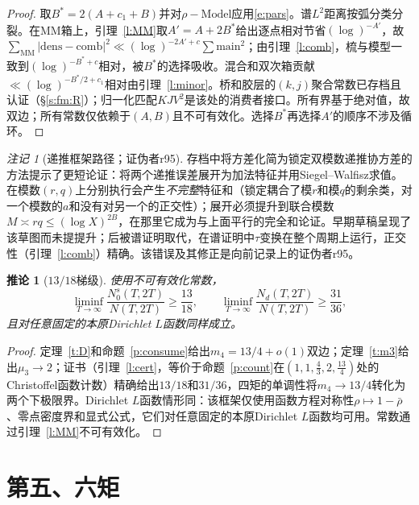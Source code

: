 \documentclass[11pt]{article}
\numberwithin{equation}{section}
\newtheorem{corollary}[theorem]{推论}
\theoremstyle{definition}
\theoremstyle{remark}
\newtheorem{remark}[theorem]{注记}
\begin{document}
\begin{proof}
取$B^{*}=2(A+c_1+B)$并对$\rho-\mathrm{Model}$应用\eqref{e:pars}。谱$L^2$距离按弧分类分裂。在MM箱上，引理~\ref{l:MM}取$A'=A+2B^{*}$给出逐点相对节省$(\log)^{-A'}$，故$\sum_{\mathrm{MM}}|\mathrm{dens}-\mathrm{comb}|^{2}
\ll(\log)^{-2A'+c}\sum\mathrm{main}^{2}$；由引理~\ref{l:comb}，梳与模型一致到$(\log)^{-B^{*}+c}$相对，被$B^{*}$的选择吸收。混合和双次箱贡献$\ll(\log)^{-B^{*}/2+c_1}$相对由引理~\ref{l:minor}。桥和胶层的$(k,j)$聚合常数已存档且认证（\S\ref{s:fm:R}）；归一化匹配$KJV^{2}$是该处的消费者接口。所有界基于绝对值，故双边；所有常数仅依赖于$(A,B)$且不可有效化。选择$B^{*}$再选择$A'$的顺序不涉及循环。
\end{proof}

\begin{remark}[递推框架路径；证伪者r95]\label{rem:prog}
存档中将方差化简为锁定双模数递推协方差的方法提示了更短论证：将两个递推误差展开为加法特征并用Siegel--Walfisz求值。在模数$(r,q)$上分别执行会产生\emph{不完整}特征和（锁定耦合了模$r$和模$q$的剩余类，对一个模数的$a$和没有对另一个的正交性）；展开必须提升到联合模数$M\asymp rq\le(\log X)^{2B}$，在那里它成为与上面平行的完全和论证。早期草稿呈现了该草图而未提提升；后被谱证明取代，在谱证明中$\tau$变换在整个周期上运行，正交性（引理~\ref{l:comb}）精确。该错误及其修正是向前记录上的证伪者r95。
\end{remark}

\begin{corollary}[$13/18$梯级]\label{c:1318}
使用不可有效化常数，
\[
\liminf_{T\to\infty}\frac{N_0^{s}(T,2T)}{N(T,2T)}\ge\frac{13}{18},
\qquad
\liminf_{T\to\infty}\frac{N_d(T,2T)}{N(T,2T)}\ge\frac{31}{36},
\]
且对任意固定的本原Dirichlet $L$函数同样成立。
\end{corollary}

\begin{proof}
定理~\ref{t:D}和命题~\ref{p:consume}给出$m_4=13/4+o(1)$双边；定理~\ref{t:m3}给出$\mu_3\to2$；证书（引理~\ref{l:cert}，等价于命题~\ref{p:count}在$(1,1,\tfrac43,2,\tfrac{13}4)$处的Christoffel函数计数）精确给出$13/18$和$31/36$，四矩的单调性将$m_4\to13/4$转化为两个下极限界。Dirichlet $L$函数情形同\cite[定理E]{C26}：该框架仅使用函数方程对称性$\rho\mapsto1-\bar\rho$、零点密度界和显式公式，它们对任意固定的本原Dirichlet $L$函数均可用。常数通过引理~\ref{l:MM}不可有效化。
\end{proof}

\section{第五、六矩}\label{s:five}
\end{document}

